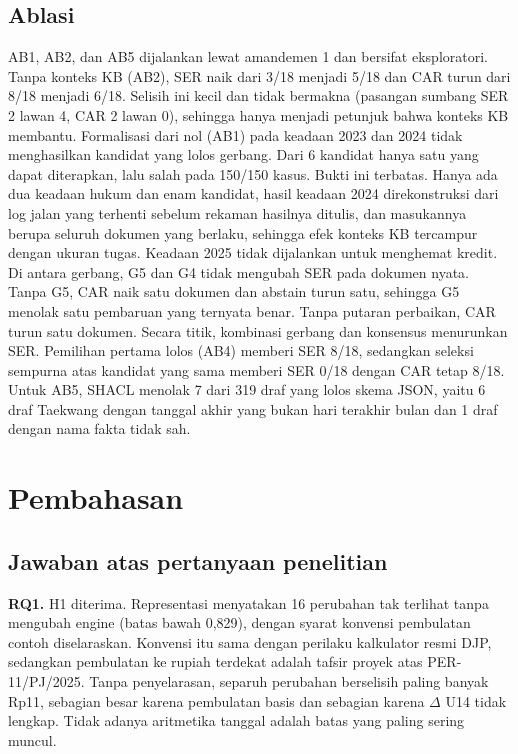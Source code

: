 \documentclass[conference]{IEEEtran}
\makeatletter
\DeclareRobustCommand{\en}[1]{{\usefont{\f@encoding}{\f@family}{\f@series}{it}#1\/}}
\makeatother
\begin{document}
\subsection{Ablasi}
AB1, AB2, dan AB5 dijalankan lewat amandemen 1 dan bersifat eksploratori. Tanpa konteks KB (AB2), SER naik dari 3/18 menjadi 5/18 dan CAR turun dari 8/18 menjadi 6/18. Selisih ini kecil dan tidak bermakna (pasangan sumbang SER 2 lawan 4, CAR 2 lawan 0), sehingga hanya menjadi petunjuk bahwa konteks KB membantu. Formalisasi dari nol (AB1) pada keadaan 2023 dan 2024 tidak menghasilkan kandidat yang lolos gerbang. Dari 6 kandidat hanya satu yang dapat diterapkan, lalu salah pada 150/150 kasus. Bukti ini terbatas. Hanya ada dua keadaan hukum dan enam kandidat, hasil keadaan 2024 direkonstruksi dari log jalan yang terhenti sebelum rekaman hasilnya ditulis, dan masukannya berupa seluruh dokumen yang berlaku, sehingga efek konteks KB tercampur dengan ukuran tugas. Keadaan 2025 tidak dijalankan untuk menghemat kredit. Di antara gerbang, G5 dan G4 tidak mengubah SER pada dokumen nyata. Tanpa G5, CAR naik satu dokumen dan \en{abstain} turun satu, sehingga G5 menolak satu pembaruan yang ternyata benar. Tanpa putaran perbaikan, CAR turun satu dokumen. Secara titik, kombinasi gerbang dan konsensus menurunkan SER. Pemilihan pertama lolos (AB4) memberi SER 8/18, sedangkan seleksi sempurna atas kandidat yang sama memberi SER 0/18 dengan CAR tetap 8/18. Untuk AB5, SHACL menolak 7 dari 319 draf yang lolos skema JSON, yaitu 6 draf Taekwang dengan tanggal akhir yang bukan hari terakhir bulan dan 1 draf dengan nama fakta tidak sah.

\section{Pembahasan}
\label{sec:pembahasan}
\subsection{Jawaban atas pertanyaan penelitian}
\textbf{RQ1.} H1 diterima. Representasi menyatakan 16 perubahan tak terlihat tanpa mengubah \en{engine} (batas bawah 0,829), dengan syarat konvensi pembulatan contoh diselaraskan. Konvensi itu sama dengan perilaku kalkulator resmi DJP, sedangkan pembulatan ke rupiah terdekat adalah tafsir proyek atas PER-11/PJ/2025. Tanpa penyelarasan, separuh perubahan berselisih paling banyak Rp11, sebagian besar karena pembulatan basis dan sebagian karena $\Delta$ U14 tidak lengkap. Tidak adanya aritmetika tanggal adalah batas yang paling sering muncul.
\end{document}
